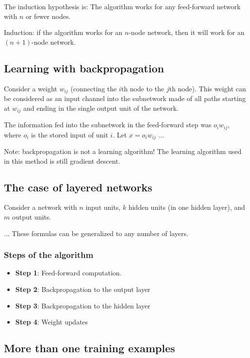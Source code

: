 \documentclass[a4paper,12pt]{article}
\begin{document}
The induction hypothesis is: The algorithm works for any feed-forward network with $n$ or fewer nodes. 

Induction: if the algorithm works for an $n$-node network, then it will work for an $(n+1)$-node network. 


\subsection{Learning with backpropagation}

Consider a weight $w_{ij}$ (connecting the $i$th node to the $j$th node). This weight can be considered as an input channel into the subnetwork made of all paths starting at $w_{ij}$ and ending in the single output unit of the network. 

The information fed into the subnetwork in the feed-forward step was $o_iw_{ij}$, where $o_i$ is the stored input of unit $i$. Let $x = o_iw_{ij}$
...

Note: backpropagation is not a learning algorithm! The learning algorithm used in this method is still gradient descent. 

\subsection{The case of layered networks}

Consider a network with $n$ input units, $k$ hidden units (in one hidden layer), and $m$ output units. 

...
These formulas can be generalized to any number of layers. 

\subsubsection{Steps of the algorithm}

\begin{itemize}
\item
\textbf{Step 1}: Feed-forward computation. 
\item
\textbf{Step 2}: Backpropagation to the output layer
\item
\textbf{Step 3}: Backpropagation to the hidden layer
\item
\textbf{Step 4}: Weight updates
\end{itemize}

\subsection{More than one training examples}
\end{document}
